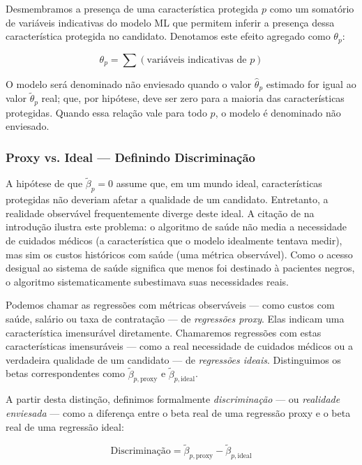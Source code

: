 \documentclass[12pt,a4paper]{article}
\begin{document}
Desmembramos a presença de uma característica protegida $p$ como um
somatório de variáveis indicativas do modelo ML que permitem inferir a
presença dessa característica protegida no candidato. Denotamos este
efeito agregado como $\theta_p$:

\begin{equation}
\theta_p = \sum(\text{variáveis indicativas de } p)
\end{equation}

O modelo será denominado não enviesado quando o valor $\hat{\theta}_p$ estimado for
igual ao valor $\tilde{\theta}_p$ real; que, por hipótese, deve ser zero para a
maioria das características protegidas. Quando essa relação vale para
todo $p$, o modelo é denominado não enviesado.


\subsubsection{Proxy vs. Ideal --- Definindo Discriminação}


A hipótese de que $\tilde{\beta}_p = 0$ assume que, em um mundo ideal,
características protegidas não deveriam afetar a qualidade de um
candidato. Entretanto, a realidade observável frequentemente diverge
deste ideal. A citação de \citet{obermeyer2019} na introdução ilustra
este problema: o algoritmo de saúde não media a necessidade de cuidados
médicos (a característica que o modelo idealmente tentava medir), mas
sim os custos históricos com saúde (uma métrica observável). Como o
acesso desigual ao sistema de saúde significa que menos foi destinado à
pacientes negros, o algoritmo sistematicamente subestimava suas
necessidades reais.

Podemos chamar as regressões com métricas observáveis --- como custos
com saúde, salário ou taxa de contratação --- de \textit{regressões proxy}.
Elas indicam uma característica imensurável diretamente. Chamaremos
regressões com estas características imensuráveis --- como a real
necessidade de cuidados médicos ou a verdadeira qualidade de um
candidato --- de \textit{regressões ideais}. Distinguimos os betas
correspondentes como \textit{$\tilde{\beta}_{p,\text{proxy}}$} e \textit{$\tilde{\beta}_{p,\text{ideal}}$}.

A partir desta distinção, definimos formalmente \textit{discriminação} --- ou
\textit{realidade enviesada} --- como a diferença entre o beta real de uma
regressão proxy e o beta real de uma regressão ideal:

\begin{equation}
\text{Discriminação} = \tilde{\beta}_{p,\text{proxy}} - \tilde{\beta}_{p,\text{ideal}}
\end{equation}
\end{document}
